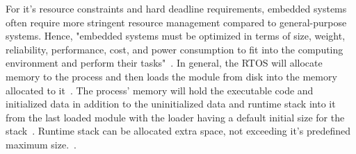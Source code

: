For it's resource constraints and hard deadline requirements, embedded systems often require more stringent resource management compared to general-purpose systems. Hence, "embedded systems must be optimized in terms of size, weight, reliability, performance, cost, and power consumption to fit into the computing environment and perform their tasks"~\cite{JiacunWang.2017}. In general, the RTOS will allocate memory to the process and then loads the module from disk into the memory allocated to it~\cite{JiacunWang.2017}. The process' memory will hold the executable code and initialized data in addition to the uninitialized data and runtime stack into it from the last loaded module with the loader having a default initial size for the stack~\cite{JiacunWang.2017}. Runtime stack can be allocated extra space, not exceeding it's predefined maximum size.~\cite{JiacunWang.2017}.


